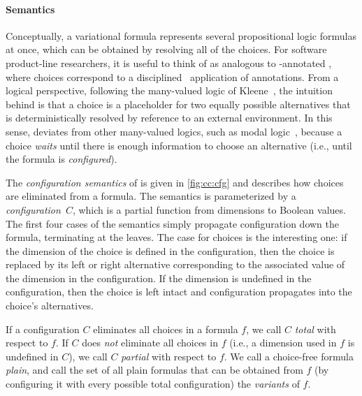 \paragraph{Semantics}
%
Conceptually, a variational formula represents several propositional logic
formulas at once, which can be obtained by resolving all of the choices. For
software product-line researchers, it is useful to think of \vpl{} as analogous
to -annotated \pl{}, where choices correspond to a
disciplined~\citep{LKA:AOSD11} application of  annotations.
%
From a logical perspective, following the many-valued logic of
Kleene~\citep{kleene1968introduction,Rescher1969-RESML}, the intuition behind
\vpl{} is that a choice is a placeholder for two equally possible alternatives
that is deterministically resolved by reference to an external environment.
%
In this sense, \vpl{} deviates from other many-valued logics, such as modal
logic~\citep{sep-logic-modal}, because a choice \emph{waits} until there is
enough information to choose an alternative (i.e., until the formula is
\emph{configured}).


The \emph{configuration semantics} of \vpl{} is given in
\autoref{fig:cc:cfg} and describes how choices are eliminated from a
formula. The semantics is parameterized by a \emph{configuration}\ $C$, which is
a partial function from dimensions to Boolean values.
%
The first four cases of the semantics simply propagate configuration down the
formula, terminating at the leaves. The case for choices is the interesting one:
if the dimension of the choice is defined in the configuration, then the choice
is replaced by its left or right alternative corresponding to the associated
value of the dimension in the configuration. If the dimension is undefined in
the configuration, then the choice is left intact and configuration propagates
into the choice's alternatives.


If a configuration $C$ eliminates all choices in a formula $f$, we call $C$
\emph{total} with respect to $f$. If $C$ does \emph{not} eliminate all choices
in $f$ (i.e., a dimension used in $f$ is undefined in $C$), we call $C$
\emph{partial} with respect to $f$.
%
We call a choice-free formula \emph{plain}, and call the set of all plain
formulas that can be obtained from $f$ (by configuring it with every possible
total configuration) the \emph{variants} of $f$.


